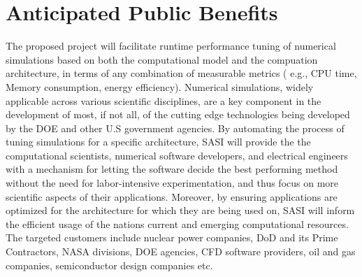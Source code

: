 \section{Anticipated Public Benefits}

The proposed project will facilitate runtime performance tuning of numerical simulations based on 
both the computational model and the compuation architecture, in terms of any combination of measurable metrics ( 
e.g., CPU time, Memory consumption, energy efficiency). Numerical simulations, widely applicable across various scientific 
disciplines, are a key component in the development of most, if not all, of the cutting edge technologies being developed 
by the DOE and other U.S government agencies. By automating the process of tuning simulations for a specific architecture, 
SASI will provide the the computational scientists, numerical software developers, and 
electrical engineers with a mechanism for letting the software decide the best performing 
method without the need for labor-intensive experimentation, and thus focus on more 
scientific aspects of their applications. Moreover, by ensuring applications are optimized for the architecture
for which they are being used on, SASI will inform the efficient usage of the nations current and emerging computational 
resources. The targeted customers include nuclear power companies, DoD and its Prime Contractors, 
NASA divisions, DOE agencies, CFD software providers, oil and gas companies, semiconductor 
design companies etc.











